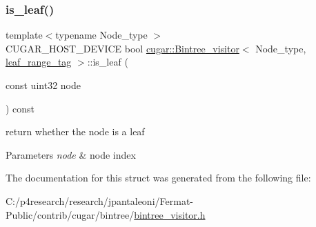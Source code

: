 \subsubsection{\texorpdfstring{is\+\_\+leaf()}{is\_leaf()}}
{\footnotesize\ttfamily template$<$typename Node\+\_\+type $>$ \\
C\+U\+G\+A\+R\+\_\+\+H\+O\+S\+T\+\_\+\+D\+E\+V\+I\+CE bool \hyperlink{structcugar_1_1_bintree__visitor}{cugar\+::\+Bintree\+\_\+visitor}$<$ Node\+\_\+type, \hyperlink{structcugar_1_1leaf__range__tag}{leaf\+\_\+range\+\_\+tag} $>$\+::is\+\_\+leaf (\begin{DoxyParamCaption}\item[{const uint32}]{node }\end{DoxyParamCaption}) const\hspace{0.3cm}{\ttfamily [inline]}}

return whether the node is a leaf


\begin{DoxyParams}{Parameters}
{\em node} & node index \\
\hline
\end{DoxyParams}


The documentation for this struct was generated from the following file\+:\begin{DoxyCompactItemize}
\item 
C\+:/p4research/research/jpantaleoni/\+Fermat-\/\+Public/contrib/cugar/bintree/\hyperlink{bintree__visitor_8h}{bintree\+\_\+visitor.\+h}\end{DoxyCompactItemize}
